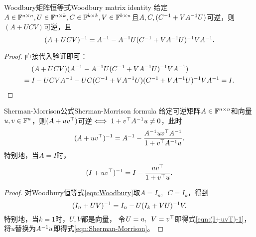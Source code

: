 
\begin{theorem}
	{Woodbury矩阵恒等式}{Woodbury matrix identity}
	给定$A\in\mathbb F^{n\times n},U\in\mathbb F^{n\times k},C\in\mathbb F^{k\times k},V\in\mathbb F^{k\times n}$且$A,C,(C^{-1}+VA^{-1} U)$可逆，则$(A+UCV)$可逆，且 
	\begin{equation}
		\label{eqn:Woodbury}
		(A+UCV)^{-1}=A^{-1}-A^{-1} U(C^{-1}+VA^{-1} U)^{-1} VA^{-1}.
	\end{equation}
\end{theorem}
\begin{proof}
	直接代入验证即可：
	\begin{align*}
		&(A+UCV)(A^{-1}-A^{-1} U(C^{-1}+VA^{-1} U)^{-1} VA^{-1})\\
		={}&I-UCVA^{-1}-UC(C^{-1}+VA^{-1} U)(C^{-1}+VA^{-1} U)^{-1} VA^{-1}=I.
		\qedhere
	\end{align*}
\end{proof}

\begin{theorem}
	{Sherman-Morrison公式}{Sherman-Morrison formula}
	给定可逆矩阵$A\in\mathbb F^{n\times n}$和向量$u,v\in\mathbb F^n$，则$(A+uv^\top)$可逆$\iff 1+v^\top A^{-1} u\neq 0$，此时
	\begin{equation}
		\label{eqn:Sherman-Morrison}
		(A+uv^\top)^{-1}=A^{-1}-\frac{A^{-1} uv^\top A^{-1}}{1+v^\top A^{-1} u}.
	\end{equation}
	特别地，当$A=I$时，
	\begin{equation}
		\label{eqn:(I+uvT)-1}
		(I+uv^\top)^{-1}=I-\frac{uv^\top}{1+v^\top u}.
	\end{equation}
\end{theorem}
\begin{proof}
	对Woodbury恒等式\eqref{eqn:Woodbury}取$A=I_n,\enspace C=I_k$，得到
	\begin{equation}
		\label{eqn:(I+UVT)-1}
		(I_n+UV)^{-1}=I_n-U(I_k+VU)^{-1} V.
	\end{equation}
	特别地，当$k=1$时，$U,V$都是向量，
	令$U=u,\enspace V=v^\top$即得式\eqref{eqn:(I+uvT)-1}，将$u$替换为$A^{-1} u$即得式\eqref{eqn:Sherman-Morrison}。
\end{proof}

